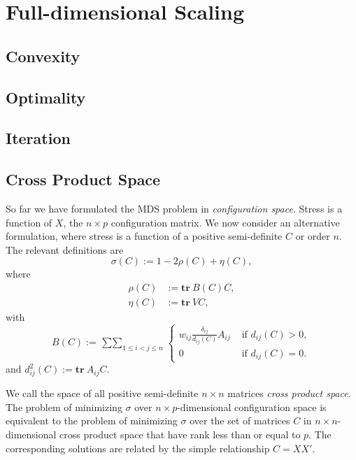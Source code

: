 \documentclass[
  12pt,
]{book}
\theoremstyle{definition}
\theoremstyle{definition}
\theoremstyle{definition}
\theoremstyle{definition}
\theoremstyle{remark}
\begin{document}
\hypertarget{fullchapter}{%
\chapter{Full-dimensional Scaling}\label{fullchapter}}

\hypertarget{fullconvex}{%
\section{Convexity}\label{fullconvex}}

\hypertarget{fulloptimal}{%
\section{Optimality}\label{fulloptimal}}

\hypertarget{fulliteration}{%
\section{Iteration}\label{fulliteration}}

\hypertarget{fullcpspace}{%
\section{Cross Product Space}\label{fullcpspace}}

So far we have formulated the MDS problem in \emph{configuration space}. Stress is a function of \(X\), the \(n\times p\) configuration matrix. We now consider an alternative formulation, where stress is a function of a positive semi-definite \(C\) or order \(n\). The relevant definitions are
\begin{equation}
\sigma(C):=1-2\rho(C)+\eta(C),
\end{equation}
where
\begin{align*}
\rho(C)&:=\mathbf{tr}\ B(C)C,\\
\eta(C)&:=\mathbf{tr}\ VC,
\end{align*}
with
\begin{equation*}
B(C):=\mathop{\sum\sum}_{1\leq i<j\leq n} \begin{cases}w_{ij}\frac{\delta_{ij}}{d_{ij}(C)}A_{ij}&\text{ if }d_{ij}(C)>0,\\
0&\text{ if }d_{ij}(C)=0.\end{cases}
\end{equation*}
and \(d_{ij}^2(C):=\mathbf{tr}\ A_{ij}C\).

We call the space of all positive semi-definite \(n\times n\) matrices \emph{cross product space}. The problem of minimizing \(\sigma\) over \(n\times p\)-dimensional configuration space is equivalent to the problem of minimizing \(\sigma\) over the set of matrices \(C\) in \(n\times n\)-dimensional cross product space that have rank less than or equal to \(p\). The corresponding solutions are related by the simple relationship \(C=XX'\).
\end{document}
